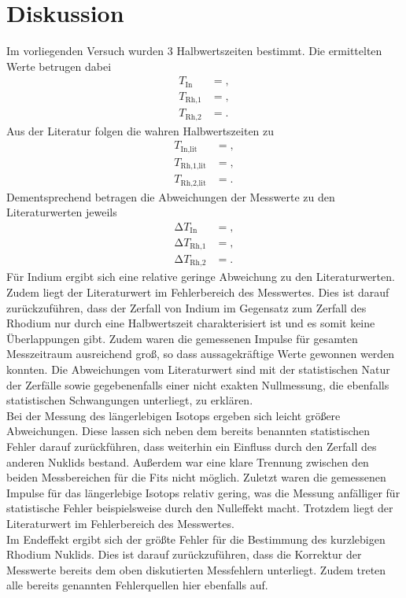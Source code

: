 \section{Diskussion}
\label{sec:Diskussion}
Im vorliegenden Versuch wurden 3 Halbwertszeiten bestimmt.
Die ermittelten Werte betrugen dabei
\begin{align*}
  T_\text{In} &= ,\\
  T_\text{Rh,1} &= ,\\
  T_\text{Rh,2} &= .
\end{align*}
Aus der Literatur \cite{halbzeiten} folgen die wahren Halbwertszeiten zu
\begin{align*}
  T_\text{In,lit} &= ,\\
  T_\text{Rh,1,lit} &= ,\\
  T_\text{Rh,2,lit} &= .
\end{align*}
Dementsprechend betragen die Abweichungen der Messwerte zu den Literaturwerten jeweils
\begin{align*}
  \increment T_\text{In} &= ,\\
  \increment T_\text{Rh,1} &= ,\\
  \increment T_\text{Rh,2} &= .
\end{align*}
Für Indium ergibt sich eine relative geringe Abweichung zu den Literaturwerten.
Zudem liegt der Literaturwert im Fehlerbereich des Messwertes.
Dies ist darauf zurückzuführen, dass der Zerfall von Indium im Gegensatz zum Zerfall des Rhodium nur durch eine Halbwertszeit charakterisiert ist und es somit keine Überlappungen gibt.
Zudem waren die gemessenen Impulse für gesamten Messzeitraum ausreichend groß, so dass aussagekräftige Werte gewonnen werden konnten.
Die Abweichungen vom Literaturwert sind mit der statistischen Natur der Zerfälle sowie gegebenenfalls einer nicht exakten Nullmessung, die ebenfalls statistischen Schwangungen unterliegt, zu erklären.\\
Bei der Messung des längerlebigen Isotops ergeben sich leicht größere Abweichungen.
Diese lassen sich neben dem bereits benannten statistischen Fehler darauf zurückführen, dass weiterhin ein Einfluss durch den Zerfall des anderen Nuklids bestand.
Außerdem war eine klare Trennung zwischen den beiden Messbereichen für die Fits nicht möglich.
Zuletzt waren die gemessenen Impulse für das längerlebige Isotops relativ gering, was die Messung anfälliger für statistische Fehler beispielsweise durch den Nulleffekt macht.
Trotzdem liegt der Literaturwert im Fehlerbereich des Messwertes.\\
Im Endeffekt ergibt sich der größte Fehler für die Bestimmung des kurzlebigen Rhodium Nuklids.
Dies ist darauf zurückzuführen, dass die Korrektur der Messwerte bereits dem oben diskutierten Messfehlern unterliegt.
Zudem treten alle bereits genannten Fehlerquellen hier ebenfalls auf.
